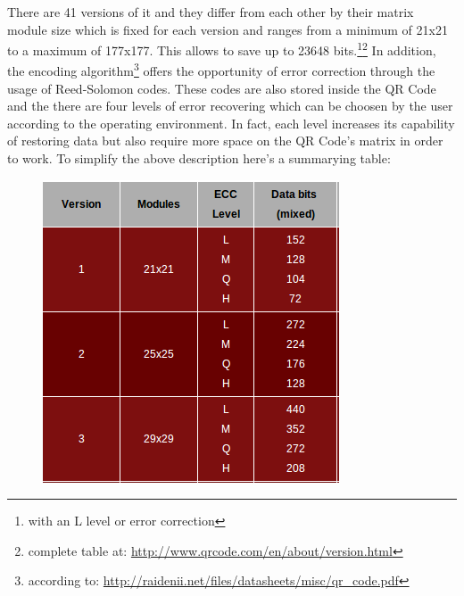 There are 41 versions of it and they differ from each other by their matrix 
module size which is fixed for each version and ranges from a minimum of 21x21 
to a maximum of 177x177. This allows to save up to 23648 bits.\footnote{with an L level or error correction}\footnote{complete table at: \url{http://www.qrcode.com/en/about/version.html}} 
\newline 
In addition, the encoding algorithm\footnote{ according to: \url{http://raidenii.net/files/datasheets/misc/qr_code.pdf}} offers the opportunity of error correction through the usage of Reed-Solomon codes.
These codes are also stored inside the QR Code and the there are four levels of error recovering which can be choosen by the user according to the operating environment.
In fact, each level increases its capability of restoring data but also require more space on the QR Code's matrix in order to work. 
\newpage
To simplify the above description here's a summarying table:
\begin{figure}[hbt]
    \centering
    \includegraphics[scale=0.9]{img/qrversion.png}
\end{figure}


   













  

